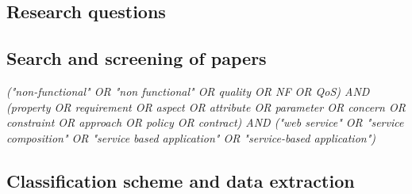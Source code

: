 


\subsection{Research questions}

\subsection{Search and screening of papers}

{\em ("non-functional" OR "non functional" OR quality OR NF OR QoS) AND (property OR requirement OR aspect OR attribute OR parameter OR concern OR constraint OR approach OR policy OR contract) AND ("web service" OR "service composition" OR "service based application" OR "service-based application")}

\subsection{Classification scheme and data extraction}